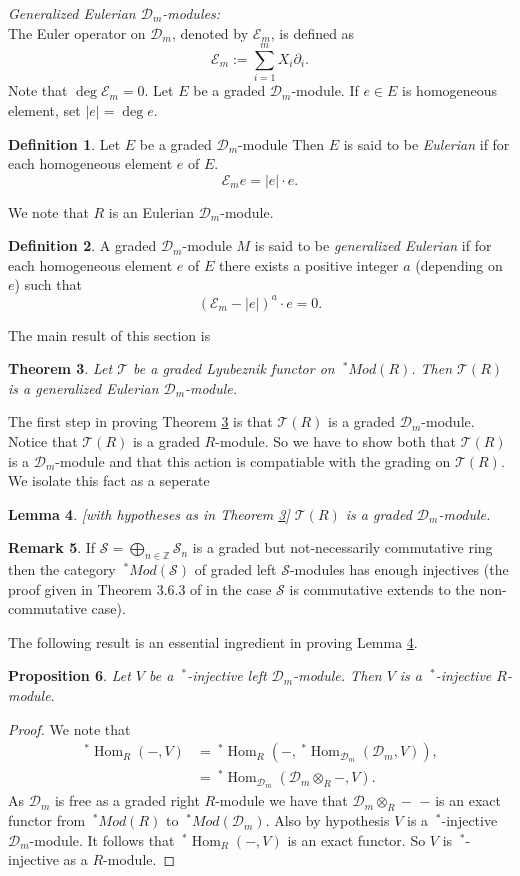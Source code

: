 \documentclass{amsart}
\newcommand{\ZZ}{\mathbb{Z} }
\newcommand{\D}{\mathcal{D} }
\newcommand{\E}{\mathcal{E} }
\newcommand{\Sc}{\mathcal{S} }
\newcommand{\FF}{\mathcal{T}}
\newcommand{\Hom}{\operatorname{Hom}}
\theoremstyle{plain}
\newtheorem{theorem}{Theorem}[section]
\newtheorem{lemma}[theorem]{Lemma}
\newtheorem{proposition}[theorem]{Proposition}
\theoremstyle{definition}
\newtheorem{definition}[theorem]{Definition}
\newtheorem{remark}[theorem]{Remark}
\theoremstyle{remark}
\begin{document}
\s \textit{Generalized Eulerian $\D_m$-modules:} \\
The Euler operator on $\D_m$, denoted by $\mathcal{E}_m$, is defined as 
$$ \E_m := \sum_{i=1}^m X_i\partial_i. $$
Note that $\deg \mathcal{E}_m  = 0$. Let $E$ be a graded $\D_m$-module. If $e \in E$ is homogeneous element, set $|e|= \deg e$.
\begin{definition}
 Let $E$ be a graded $\D_m$-module  Then $E$ is said to be  \textit{Eulerian} if    for each homogeneous element $e$
 of $E$.
$$ \mathcal{E}_m e= |e|\cdot e.$$ 
\end{definition}
We note that $R$ is an Eulerian $\D_m$-module.
\begin{definition}
A graded $\D_m$-module $M$ is said to be \textit{generalized Eulerian} if for each homogeneous element $e$ of $E$
there exists a positive integer $a$ (depending on $e$) such that
$$ (\mathcal{E}_m- {|e|})^a \cdot e = 0.$$
\end{definition}



The main result of this section is
\begin{theorem}\label{gen-eul-Lyu}
 Let $\FF$ be a graded Lyubeznik functor on $ \ ^* Mod(R)$. Then $\FF(R)$ is a generalized Eulerian $\D_m$-module.
\end{theorem}
The first step in proving Theorem \ref{gen-eul-Lyu} is that $\FF(R)$ is a graded $\D_m$-module. Notice that $\FF(R)$ is a graded $R$-module.
So we have to show both that $\FF(R)$ is a $\D_m$-module and that this action is compatiable with the grading on $\FF(R)$.
We isolate this fact as a seperate
\begin{lemma}\label{BHU}
 [with hypotheses as in Theorem \ref{gen-eul-Lyu}] $\FF(R)$ is a graded  $\D_m$-module.
\end{lemma}
\begin{remark}
 If $\Sc = \bigoplus_{n \in \ZZ} \Sc_n$ is a graded  but not-necessarily commutative ring then the category $\ ^* Mod(\Sc)$
 of graded left $\Sc$-modules has enough injectives (the proof given in Theorem 3.6.3 of \cite{BH} in the case
 $\Sc$ is commutative extends to the non-commutative case).
\end{remark}
The following result is an essential ingredient in proving Lemma \ref{BHU}.
\begin{proposition}\label{inj}
Let $V$ be a $ \ ^* $-injective left $\D_m$-module. Then $V$ is a $ \ ^* $-injective $R$-module.
 \end{proposition}
\begin{proof}
 We note that
 \begin{align*}
  \ ^* \Hom_R(- , V) &= \ ^* \Hom_R \left(- , \ ^* \Hom_{\D_m}( \D_m , V) \right), \\
  &= \ ^* \Hom_{\D_m}( \D_m \otimes_R -, V).
 \end{align*}
As $\D_m$ is free as a  graded right $R$-module we have that $\D_m\otimes_R -$ − is an exact functor
from  $ \ ^* Mod(R)$  to $\ ^* Mod(\D_m)$. Also by hypothesis 
$V$ is a $\ ^*$-injective $\D_m$-module. It
follows that  $ \ ^* \Hom_R(- , V) $ is an exact functor. So $V$  is $\ ^*$-injective as a $R$-module.
\end{proof}
\end{document}

